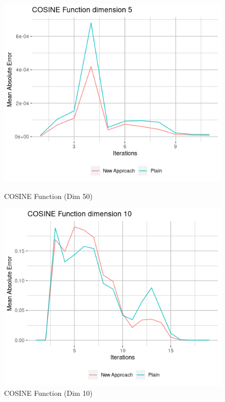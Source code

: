 \documentclass{article}
\begin{document}
\begin{figure}[H]
\begin{minipage}[b]{0.5\linewidth}
		\vspace{4ex}
	\end{minipage} 
	\begin{minipage}[b]{0.5\linewidth}
		\centering
		\includegraphics[scale=0.5]{plots/COSINE_dim5.png} 
		\caption{COSINE Function (Dim 50)} 
		\vspace{4ex}
	\end{minipage}%
	\begin{minipage}[b]{0.5\linewidth}
		\centering
		\includegraphics[scale=0.5]{plots/COSINE_dim10.png}  
		\caption{COSINE Function (Dim 10)} 

\end{minipage}
\end{figure}
\end{document}

